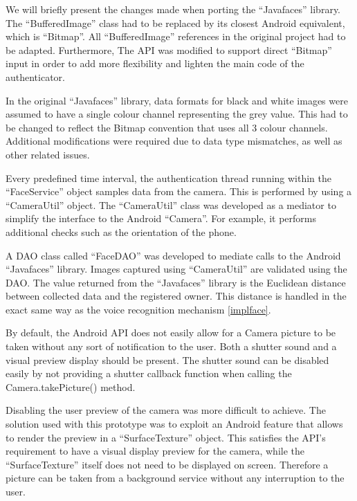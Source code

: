 We will briefly present the changes made when porting the ``Javafaces'' library. The ``BufferedImage'' class had to be replaced by its closest Android equivalent, which is ``Bitmap''. All ``BufferedImage'' references in the original project had to be adapted. Furthermore, The API was modified to support direct ``Bitmap'' input in order to add more flexibility and lighten the main code of the authenticator. 

In the original ``Javafaces'' library, data formats for black and white images were assumed to have a single colour channel representing the grey value. This had to be changed to reflect the Bitmap convention that uses all 3 colour channels. Additional modifications were required due to data type mismatches, as well as other related issues.

Every predefined time interval, the authentication thread running within the ``FaceService'' object samples data from the camera. This is performed by using a ``CameraUtil'' object. The ``CameraUtil'' class was developed as a mediator to simplify the interface to the Android ``Camera''. For example, it performs additional checks such as the orientation of the phone. 

A DAO class called ``FaceDAO'' was developed to mediate calls to the Android ``Javafaces'' library. Images captured using ``CameraUtil'' are validated using the DAO. The value returned from the ``Javafaces'' library is the Euclidean distance between collected data and the registered owner. This distance is handled in the exact same way as the voice recognition mechanism \ref{implface}.

By default, the Android API does not easily allow for a Camera picture to be taken without any sort of notification to the user. Both a shutter sound and a visual preview display should be present. The shutter sound can be disabled easily by not providing a shutter callback function when calling the Camera.takePicture() method. 

Disabling the user preview of the camera was more difficult to achieve. The solution used with this prototype was to exploit an Android feature that allows to render the preview in a ``SurfaceTexture'' object. This satisfies the API's requirement to have a visual display preview for the camera, while the ``SurfaceTexture'' itself does not need to be displayed on screen. Therefore a picture can be taken from a background service without any interruption to the user.

